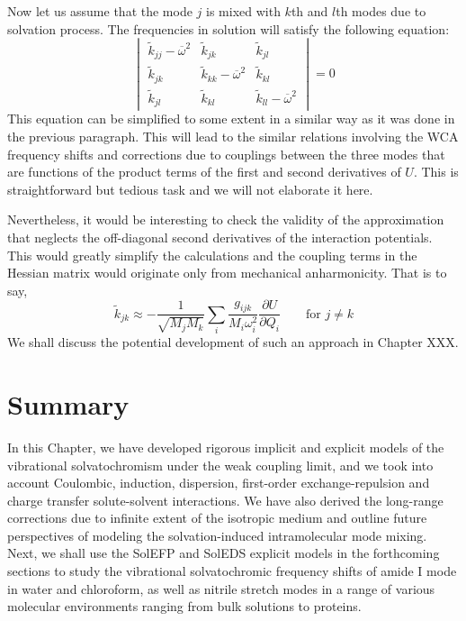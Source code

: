 \documentclass[a4paper,titlepage,twoside,fleqn,12pt]{book}
\newcommand{\fderiv}[2]{\ensuremath{
\frac{\partial #1}{\partial #2}}}
\begin{document}
\begin{refsection}
Now let us assume that the mode $j$ is mixed with $k$th and $l$th modes
due to solvation process. The frequencies in solution will satisfy the following
equation:
%
\begin{equation}
\begin{vmatrix}
\tilde{k}_{jj} - \overline{\omega}^2 & \tilde{k}_{jk}                       & \tilde{k}_{jl}                       \\ 
\tilde{k}_{jk}                       & \tilde{k}_{kk} - \overline{\omega}^2 & \tilde{k}_{kl}                       \\ 
\tilde{k}_{jl}                       & \tilde{k}_{kl}                       & \tilde{k}_{ll} - \overline{\omega}^2
\end{vmatrix}
= 0
\end{equation}
%
This equation can be simplified to some extent in a similar way
as it was done in the previous paragraph. This will lead to the
similar relations involving the WCA frequency shifts and
corrections due to couplings between the three modes that are
functions of the product terms of the first and second derivatives
of $U$. This is straightforward but tedious task and we will not
elaborate it here.

Nevertheless, it would be interesting to check the validity
of the approximation that neglects the off\hyp{}diagonal second
derivatives of the interaction potentials. This would greatly 
simplify the calculations and the coupling terms in the Hessian
matrix would originate only from mechanical anharmonicity.
That is to say,
%
\begin{equation} 
 \tilde{k}_{jk} \approx - \frac{1}{\sqrt{M_jM_k}}\sum_i  
                             \frac{g_{ijk}}{M_i\omega_i^2}\fderiv{U}{Q_i} \qquad \text{for $j\ne k$} 
\end{equation}
%
We shall discuss the potential development of such an approach
in Chapter XXX. %

\section{Summary}

In this Chapter, we have developed rigorous implicit and
explicit models of the vibrational solvatochromism under
the weak coupling limit, and we took into account
Coulombic, induction, dispersion, first\hyp{}order 
exchange\hyp{}repulsion and charge transfer solute\hyp{}solvent
interactions. We have also derived the long\hyp{}range
corrections due to infinite extent of the isotropic medium
and outline future perspectives of modeling the solvation\hyp{}induced
intramolecular mode mixing. 
Next, we shall use the SolEFP and SolEDS explicit models
in the forthcoming sections to study the vibrational solvatochromic
frequency shifts of amide I mode in water and chloroform, 
as well as nitrile stretch modes in a range of various molecular
environments ranging from bulk solutions to proteins.



\end{refsection}
\end{document}
